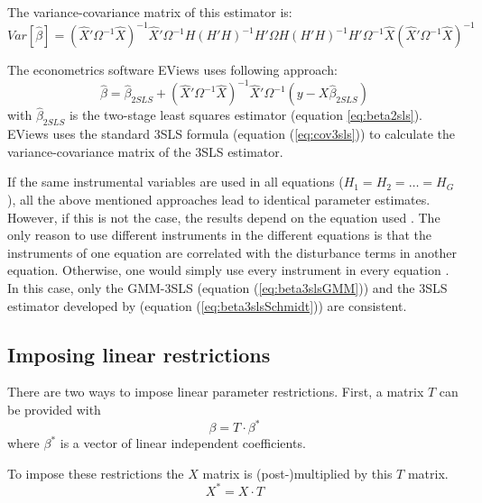 \documentclass[article]{jss}
\begin{document}
The variance-covariance matrix of this estimator is:
\begin{equation}
   Var \left[ \widehat{\beta} \right] = 
   \left( \widehat{X}' \Omega^{-1}  \widehat{X} \right)^{-1} 
   \widehat{X}' \Omega^{-1} H \left( H' H \right)^{-1} H' \Omega 
   H \left( H' H \right)^{-1} H' \Omega^{-1} \widehat{X}
   \left( \widehat{X}' \Omega^{-1}  \widehat{X} \right)^{-1}
\end{equation}


The econometrics software EViews uses following approach:
\begin{equation}
   \widehat{\beta} = \widehat{\beta}_{2SLS} + 
   \left( \widehat{X}' \Omega^{-1} \widehat{X} \right)^{-1} 
   \widehat{X}' \Omega^{-1} \left( y - X \widehat{\beta}_{2SLS} \right)
\end{equation}
with $\widehat{\beta}_{2SLS}$ is the two-stage least squares estimator
(equation \ref{eq:beta2sls}).
EViews uses the standard 3SLS formula (equation (\ref{eq:cov3sls})) to 
calculate the variance-covariance matrix of the 3SLS estimator.


If the same instrumental variables are used in all equations 
($H_1 = H_2 = \ldots = H_G$), 
all the above mentioned approaches lead to identical parameter estimates.
However, if this is not the case, the results depend on the 
equation used \citep{schmidt90}. 
The only reason to use different instruments in the different equations 
is that the instruments of one equation are correlated with the
disturbance terms in another equation. Otherwise, one would simply use
every instrument in every equation \citep{schmidt90}. 
In this case, only the GMM-3SLS (equation (\ref{eq:beta3slsGMM}))
and the 3SLS estimator developed by \cite{schmidt90} 
(equation (\ref{eq:beta3slsSchmidt})) are consistent.


\subsection{Imposing linear restrictions}
There are two ways to impose linear parameter restrictions.
First, a matrix $T$ can be provided with
\begin{equation}
   \beta = T \cdot \beta^* \label{eq:T-restr} 
\end{equation}
where $\beta^*$ is a vector of linear independent coefficients.

To impose these restrictions the $X$ matrix is
(post-)multiplied by this $T$ matrix.
\begin{equation}
    X^* = X \cdot T
\end{equation}
\end{document}

